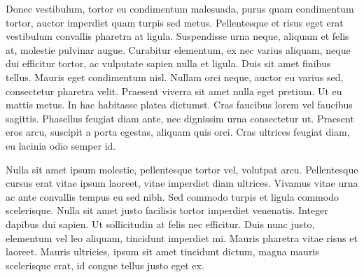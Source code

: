 \documentclass[../main.tex]{subfiles}
\begin{document}
Donec vestibulum, tortor eu condimentum malesuada, purus quam condimentum tortor, auctor imperdiet quam turpis sed metus. Pellentesque et risus eget erat vestibulum convallis pharetra at ligula. Suspendisse urna neque, aliquam et felis at, molestie pulvinar augue. Curabitur elementum, ex nec varius aliquam, neque dui efficitur tortor, ac vulputate sapien nulla et ligula. Duis sit amet finibus tellus. Mauris eget condimentum nisl. Nullam orci neque, auctor eu varius sed, consectetur pharetra velit. Praesent viverra sit amet nulla eget pretium. Ut eu mattis metus. In hac habitasse platea dictumst. Cras faucibus lorem vel faucibus sagittis. Phasellus feugiat diam ante, nec dignissim urna consectetur ut. Praesent eros arcu, suscipit a porta egestas, aliquam quis orci. Cras ultrices feugiat diam, eu lacinia odio semper id.

Nulla sit amet ipsum molestie, pellentesque tortor vel, volutpat arcu. Pellentesque cursus erat vitae ipsum laoreet, vitae imperdiet diam ultrices. Vivamus vitae urna ac ante convallis tempus eu sed nibh. Sed commodo turpis et ligula commodo scelerisque. Nulla sit amet justo facilisis tortor imperdiet venenatis. Integer dapibus dui sapien. Ut sollicitudin at felis nec efficitur. Duis nunc justo, elementum vel leo aliquam, tincidunt imperdiet mi. Mauris pharetra vitae risus et laoreet. Mauris ultricies, ipsum sit amet tincidunt dictum, magna mauris scelerisque erat, id congue tellus justo eget ex. 
\end{document}
